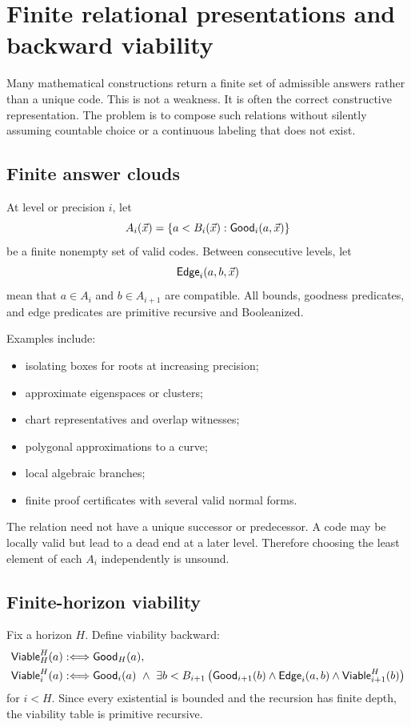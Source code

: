 \section{Finite relational presentations and backward viability}
\label{sec:viability}

Many mathematical constructions return a finite set of admissible answers rather than a unique code.  This is not a weakness.  It is often the correct constructive representation.  The problem is to compose such relations without silently assuming countable choice or a continuous labeling that does not exist.

\subsection{Finite answer clouds}

At level or precision \(i\), let
\[
  A_i(\vec{x})=\{a<B_i(\vec{x}) : \mathsf{Good}_i(a,\vec{x})\}
\]
be a finite nonempty set of valid codes.  Between consecutive levels, let
\[
  \mathsf{Edge}_i(a,b,\vec{x})
\]
mean that \(a\in A_i\) and \(b\in A_{i+1}\) are compatible.  All bounds, goodness predicates, and edge predicates are primitive recursive and Booleanized.

Examples include:

\begin{itemize}
\item isolating boxes for roots at increasing precision;
\item approximate eigenspaces or clusters;
\item chart representatives and overlap witnesses;
\item polygonal approximations to a curve;
\item local algebraic branches;
\item finite proof certificates with several valid normal forms.
\end{itemize}

The relation need not have a unique successor or predecessor.  A code may be locally valid but lead to a dead end at a later level.  Therefore choosing the least element of each \(A_i\) independently is unsound.

\subsection{Finite-horizon viability}

Fix a horizon \(H\).  Define viability backward:
\begin{align*}
 \mathsf{Viable}_H^H(a)&:\Longleftrightarrow \mathsf{Good}_H(a),\\
 \mathsf{Viable}_i^H(a)&:\Longleftrightarrow
   \mathsf{Good}_i(a)\ \wedge\
   \exists b<B_{i+1}\,
     \bigl(\mathsf{Good}_{i+1}(b)\wedge\mathsf{Edge}_i(a,b)
                    \wedge\mathsf{Viable}_{i+1}^H(b)\bigr)
\end{align*}
for \(i<H\).  Since every existential is bounded and the recursion has finite depth, the viability table is primitive recursive.

